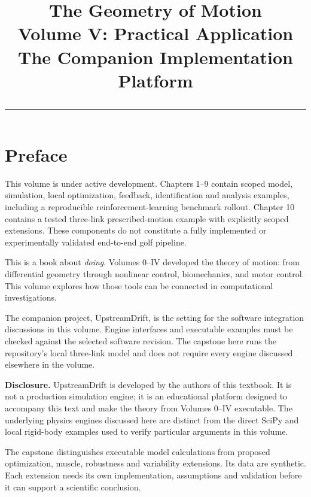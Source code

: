 \documentclass[10pt,letterpaper,openany]{book}
\title{%
  {\Huge\bfseries\color{chapblue} The Geometry of Motion}\\[0.4cm]
  {\Large Volume V: Practical Application\\
  The Companion Implementation Platform}\\[0.6cm]
  {\color{chapblue}\rule{\textwidth}{2pt}}
}
\date{}
\theoremstyle{plain}
\theoremstyle{remark}
\theoremstyle{plain}
\begin{document}
\maketitle
\thispagestyle{empty}
\cleardoublepage

\frontmatter
\chapter*{Preface}

\begin{gomdraftnotice}
This volume is under active development. Chapters 1--9 contain scoped model,
simulation, local optimization, feedback, identification and analysis examples,
including a reproducible reinforcement-learning benchmark rollout. Chapter 10
contains a tested three-link prescribed-motion example with explicitly scoped
extensions. These components do not constitute a fully implemented or
experimentally validated end-to-end golf pipeline.
\end{gomdraftnotice}

This is a book about \emph{doing}. Volumes 0--IV developed the theory of motion: from
differential geometry through nonlinear control, biomechanics, and motor control. This
volume explores how those tools can be connected in computational investigations.

The companion project, UpstreamDrift, is the setting for the software
integration discussions in this volume. Engine interfaces and executable
examples must be checked against the selected software revision. The capstone
here runs the repository's local three-link model and does not require every
engine discussed elsewhere in the volume.

\medskip\noindent\textbf{Disclosure.} UpstreamDrift is developed by the authors of this
textbook. It is not a production simulation engine; it is an educational platform designed
to accompany this text and make the theory from Volumes 0--IV executable. The underlying
physics engines discussed here are distinct from the direct SciPy and local
rigid-body examples used to verify particular arguments in this volume.

The capstone distinguishes executable model calculations from proposed
optimization, muscle, robustness and variability extensions. Its data are
synthetic. Each extension needs its own implementation, assumptions and
validation before it can support a scientific conclusion.

\tableofcontents

\cleardoublepage

\mainmatter












\backmatter
\printindex



\end{document}
